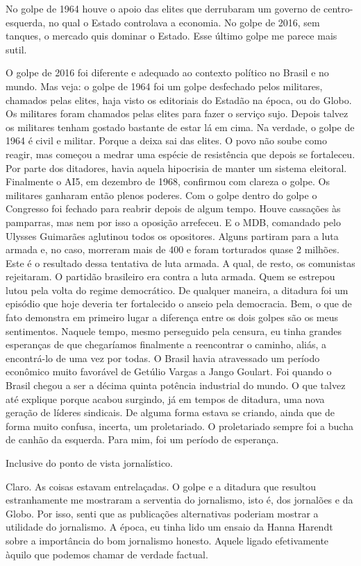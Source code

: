  No golpe de 1964 houve o apoio das elites que derrubaram um governo
de centro-esquerda, no qual o Estado controlava a economia. No golpe de
2016, sem tanques, o mercado quis dominar o Estado. Esse último golpe me
parece mais sutil.

 O golpe de 2016 foi diferente e adequado ao contexto político no
Brasil e no mundo. Mas veja: o golpe de 1964 foi um golpe desfechado
pelos militares, chamados pelas elites, haja visto os editoriais do
Estadão na época, ou do Globo. Os militares foram chamados pelas elites
para fazer o serviço sujo. Depois talvez os militares tenham gostado
bastante de estar lá em cima. Na verdade, o golpe de 1964 é civil e
militar. Porque a deixa sai das elites. O povo não soube como reagir,
mas começou a medrar uma espécie de resistência que depois se
fortaleceu. Por parte dos ditadores, havia aquela hipocrisia de manter
um sistema eleitoral. Finalmente o AI5, em dezembro de 1968, confirmou
com clareza o golpe. Os militares ganharam então plenos poderes. Com o
golpe dentro do golpe o Congresso foi fechado para reabrir depois de
algum tempo. Houve cassações às pamparras, mas nem por isso a oposição
arrefeceu. E o MDB, comandado pelo Ulysses Guimarães aglutinou todos os
opositores. Alguns partiram para a luta armada e, no caso, morreram mais
de 400 e foram torturados quase 2 milhões. Este é o resultado dessa
tentativa de luta armada. A qual, de resto, os comunistas rejeitaram. O
partidão brasileiro era contra a luta armada. Quem se estrepou lutou
pela volta do regime democrático. De qualquer maneira, a ditadura foi um
episódio que hoje deveria ter fortalecido o anseio pela democracia. Bem,
o que de fato demonstra em primeiro lugar a diferença entre os dois
golpes são os meus sentimentos. Naquele tempo, mesmo perseguido pela
censura, eu tinha grandes esperanças de que chegaríamos finalmente a
reencontrar o caminho, aliás, a encontrá-lo de uma vez por todas. O
Brasil havia atravessado um período econômico muito favorável de Getúlio
Vargas a Jango Goulart. Foi quando o Brasil chegou a ser a décima quinta
potência industrial do mundo. O que talvez até explique porque acabou
surgindo, já em tempos de ditadura, uma nova geração de líderes
sindicais. De alguma forma estava se criando, ainda que de forma muito
confusa, incerta, um proletariado. O proletariado sempre foi a bucha de
canhão da esquerda. Para mim, foi um período de esperança.

 Inclusive do ponto de vista jornalístico.

 Claro. As coisas estavam entrelaçadas. O golpe e a ditadura que
resultou estranhamente me mostraram a serventia do jornalismo, isto é,
dos jornalões e da Globo. Por isso, senti que as publicações
alternativas poderiam mostrar a utilidade do jornalismo. A época, eu
tinha lido um ensaio da Hanna Harendt sobre a importância do bom
jornalismo honesto. Aquele ligado efetivamente àquilo que podemos chamar
de verdade factual.

